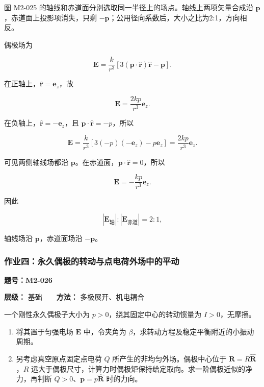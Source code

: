 图 M2-025 的轴线和赤道面分别选取同一半径上的场点。轴线上两项矢量合成沿
\(\mathbf p\)，赤道面上投影项消失，只剩
\(-\mathbf p\)；公用径向系数后，大小之比为2:1，方向相反。

偶极场为

\[
\mathbf E
=\frac{k}{r^3}
\left[3(\mathbf p\cdot\hat{\mathbf r})\hat{\mathbf r}-\mathbf p\right].
\]

在正轴上，\(\hat{\mathbf r}=\mathbf e_z\)，故

\[
\mathbf E=\frac{2kp}{r^3}\mathbf e_z.
\]

在负轴上，\(\hat{\mathbf r}=-\mathbf e_z\)，且
\(\mathbf p\cdot\hat{\mathbf r}=-p\)，所以

\[
\mathbf E
=\frac{k}{r^3}
\left[3(-p)(-\mathbf e_z)-p\mathbf e_z\right]
=\frac{2kp}{r^3}\mathbf e_z.
\]

可见两侧轴线场都沿
\(\mathbf p\)。在赤道面，\(\mathbf p\cdot\hat{\mathbf r}=0\)，所以

\[
\mathbf E=-\frac{kp}{r^3}\mathbf e_z.
\]

因此

\[
|\mathbf E_{\mathrm{\text{轴}}}|:|\mathbf E_{\mathrm{\text{赤道}}}|=2:1,
\]

轴线场沿 \(\mathbf p\)，赤道面场沿 \(-\mathbf p\)。

\subsubsection{作业四：永久偶极的转动与点电荷外场中的平动}\label{m2:ux4f5cux4e1aux56dbux6c38ux4e45ux5076ux6781ux7684ux8f6cux52a8ux4e0eux70b9ux7535ux8377ux5916ux573aux4e2dux7684ux5e73ux52a8}

\textbf{题号：M2-026}

\textbf{层级：} 基础　　\textbf{方法：} 多极展开、机电耦合

一个刚性永久偶极子大小为 \(p>0\)，绕其固定中心的转动惯量为
\(I>0\)，无摩擦。

\begin{enumerate}
\def\labelenumi{(\arabic{enumi})}
\item
  将其置于匀强电场 \(\mathbf E\) 中，令夹角为
  \(\beta\)，求转动方程及稳定平衡附近的小振动周期。
\item
  另考虑真空原点固定点电荷 \(Q\) 所产生的非均匀外场。偶极中心位于
  \(\mathbf R=R\hat{\mathbf R}\)，\(R\)
  远大于偶极尺寸，计算力时偶极矩保持给定取向。求一阶偶极近似的净力，再判断
  \(Q>0\)、\(\mathbf p=p\hat{\mathbf R}\) 时的力向。
\end{enumerate}

